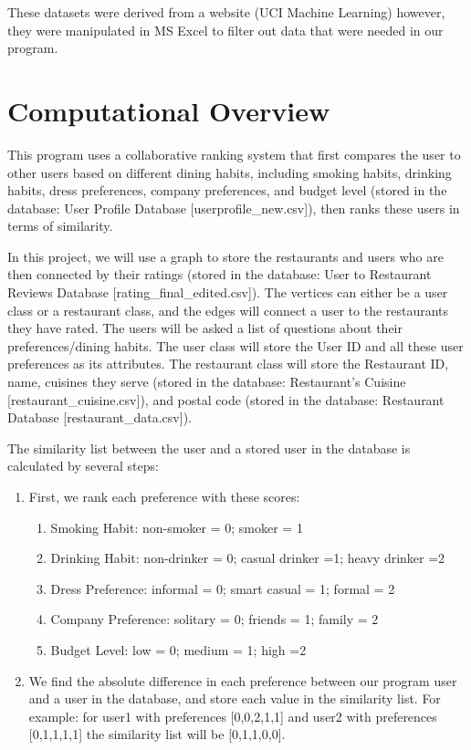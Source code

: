 \documentclass{article}
\begin{document}
These datasets were derived from a website (UCI Machine Learning) however, they were manipulated in MS Excel to filter out data that were needed in our program. 



\section{Computational Overview}

This program uses a collaborative ranking system that first compares the user to other users based on different dining habits, including smoking habits, drinking habits, dress preferences, company preferences, and budget level (stored in the database: User Profile Database [userprofile\_new.csv]), then ranks these users in terms of similarity.

In this project, we will use a graph to store the restaurants and users who are then connected by their ratings (stored in the database:  User to Restaurant Reviews Database [rating\_final\_edited.csv]). The vertices can either be a user class or a restaurant class, and the edges will connect a user to the restaurants they have rated. The users will be asked a list of questions about their preferences/dining habits. The user class will store the User ID and all these user preferences as its attributes.  The restaurant class will store the Restaurant ID, name, cuisines they serve (stored in the database: Restaurant’s Cuisine [restaurant\_cuisine.csv]), and postal code (stored in the database: Restaurant Database [restaurant\_data.csv]).

The similarity list between the user and a stored user in the database is calculated by several steps:
\begin{enumerate}
    \item First, we rank each preference with these scores:
    \begin{enumerate}
        \item Smoking Habit: non-smoker = 0;  smoker = 1
        \item Drinking Habit: non-drinker = 0; casual drinker =1; heavy drinker =2
        \item Dress Preference: informal = 0; smart casual = 1; formal = 2
        \item Company Preference: solitary = 0; friends = 1; family = 2
        \item Budget Level: low = 0; medium = 1; high =2
    \end{enumerate}
    \item We find the absolute difference in each preference between our program user and a user in the database, and store each value in the similarity list. For example: for user1 with preferences [0,0,2,1,1] and user2 with preferences [0,1,1,1,1] the similarity list will be [0,1,1,0,0].
\end{enumerate}
\end{document}
